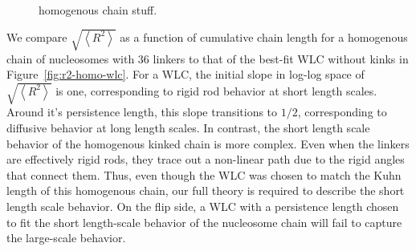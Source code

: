 \documentclass[%
 reprint,
superscriptaddress,
showpacs,preprintnumbers,
 amsmath,amssymb,
 aps,
 prl,
]{revtex4-1}
\newcommand{\RR}{\left\langle{}R^2\right\rangle{}}
\begin{document}
\begin{figure}
    \mbox{%
    }\caption{homogenous chain stuff.}\label{fig:homo-chain}
\end{figure}

We compare $\sqrt{\RR}$ as a
function of cumulative chain length for a homogenous chain of
nucleosomes with \SI{36}{\basepair} linkers to that of the best-fit WLC without
kinks in Figure~\ref{fig:r2-homo-wlc}.
For a WLC, the initial slope in log-log space of $\sqrt{\RR}$ is one,
    corresponding to rigid rod behavior at short length scales.
Around it's persistence length, this slope transitions to $1/2$, corresponding
    to diffusive behavior at long length scales.
In contrast, the short length scale behavior of the homogenous kinked chain is more
    complex. Even when the linkers are effectively rigid rods, they trace
    out a non-linear path due to the rigid angles that connect them.
Thus, even though the WLC was chosen to match the Kuhn length of this
    homogenous chain, our full theory is required to describe the short length
    scale behavior. On the flip side, a WLC with a persistence length chosen to fit the short length-scale behavior of the nucleosome chain will fail to capture the large-scale behavior.
\end{document}
